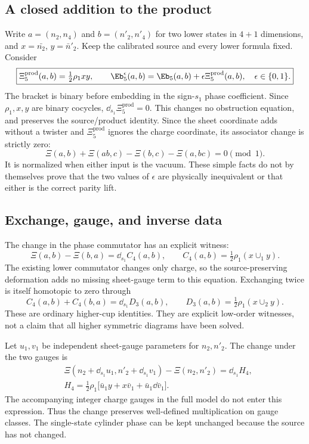 \subsection{A closed addition to the product}
Write $a=({n_2},{n_4})$ and $b=({n'_2},{n'_4})$ for two lower states in $4+1$ dimensions, and $x=\bar {n_2}$, $y=\bar n'_2$. Keep the calibrated source and every lower formula fixed. Consider
\begin{equation}\label{eq:productbit05}
 \boxed{\Xi_5^{\mathrm{prod}}(a,b)=\tfrac12{\rho_1}xy,\qquad
 \Eb_5^{\epsilon}(a,b)=\Eb_5(a,b)+\epsilon\Xi_5^{\mathrm{prod}}(a,b),
 \quad \epsilon\in\{0,1\}.}
\end{equation}
The bracket is binary before embedding in the sign-${s_1}$ phase coefficient. Since ${\rho_1},x,y$ are binary cocycles, $\dd_{s_1}\Xi_5^{\mathrm{prod}}=0$. This changes no obstruction equation, and preserves the source/product identity. Since the sheet coordinate adds without a twister and $\Xi_5^{\mathrm{prod}}$ ignores the charge coordinate, its associator change is strictly zero:
\begin{equation}
 \Xi(a,b)+\Xi(ab,c)-\Xi(b,c)-\Xi(a,bc)=0\pmod1.
\end{equation}
It is normalized when either input is the vacuum. These simple facts do not by themselves prove that the two values of $\epsilon$ are physically inequivalent or that either is the correct parity lift.


\subsection{Exchange, gauge, and inverse data}
The change in the phase commutator has an explicit witness:
\begin{equation}\label{eq:exchange05}
 \Xi(a,b)-\Xi(b,a)=\dd_{s_1} C_4(a,b),
 \qquad C_4(a,b)=\tfrac12{\rho_1}(x\cup_1 y).
\end{equation}
The existing lower commutator changes only charge, so the source-preserving deformation adds no missing sheet-gauge term to this equation. Exchanging twice is itself homotopic to zero through
\begin{equation}\label{eq:doubleexchange05}
 C_4(a,b)+C_4(b,a)=\dd_{s_1} D_3(a,b),
 \qquad D_3(a,b)=\tfrac12{\rho_1}(x\cup_2y).
\end{equation}
These are ordinary higher-cup identities. They are explicit low-order witnesses, not a claim that all higher symmetric diagrams have been solved.

Let $u_1,v_1$ be independent sheet-gauge parameters for ${n_2},{n'_2}$. The change under the two gauges is
\begin{align}\label{eq:pairgauge05}
 &\Xi({n_2}+\dd_{s_1}u_1,{n'_2}+\dd_{s_1}v_1)-\Xi({n_2},{n'_2})=\dd_{s_1} H_4,\\
 &H_4=\tfrac12{\rho_1}\bigl[\bar u_1y+x\bar v_1+\bar u_1\dd\bar v_1\bigr].\nonumber
\end{align}
The accompanying integer charge gauges in the full model do not enter this expression. Thus the change preserves well-defined multiplication on gauge classes. The single-state cylinder phase can be kept unchanged because the source has not changed.

